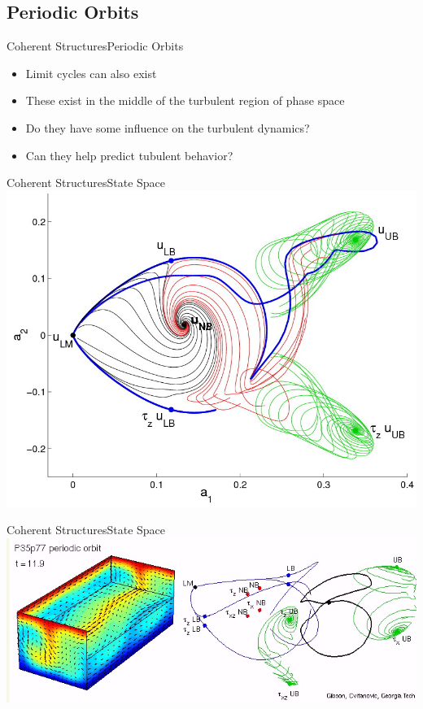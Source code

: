 \documentclass[10pt]{beamer}
\begin{document}
\subsection{Periodic Orbits}
\begin{frame}{Coherent Structures}{Periodic Orbits}
\begin{itemize}
\item<1-> Limit cycles can also exist
\item<2-> These exist in the middle of the turbulent region of phase space
\item<3-> Do they have some influence on the turbulent dynamics?
\item<4-> Can they help predict tubulent behavior? 
\end{itemize}
\end{frame}
\begin{frame}{Coherent Structures}{State Space}
\includegraphics[scale=0.3]{Data/stateSpace}
\end{frame}
\begin{frame}{Coherent Structures}{State Space}
\includegraphics[scale=0.5]{Data/periodicOrbit}
\end{frame}
\end{document}
